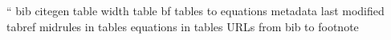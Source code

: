 ``
bib
citegen
table width
table bf
tables to equations
metadata
last modified
tabref
midrules in tables
equations in tables
URLs from bib to footnote
